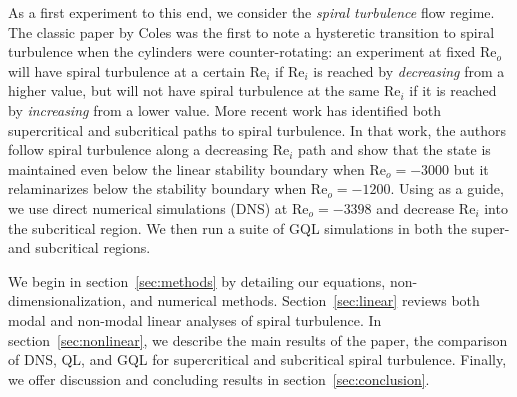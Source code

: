 \documentclass[openacc]{rstransa}%
\newcommand{\Reyn}{\mathrm{Re}}
\begin{document}
As a first experiment to this end, we consider the \emph{spiral turbulence} flow regime. The classic paper by Coles \cite{1965JFM....21..385C} was the first to note a hysteretic transition to spiral turbulence when the cylinders were counter-rotating: an experiment at fixed $\Reyn_o$ will have spiral turbulence at a certain $\Reyn_i$ if $\Reyn_i$ is reached by \emph{decreasing} from a higher value, but will not have spiral turbulence at the same $\Reyn_i$ if it is reached by \emph{increasing} from a lower value. More recent work has identified both supercritical and subcritical paths to spiral turbulence\cite{2009PhRvE..80d6315M}. In that work, the authors follow spiral turbulence along a decreasing $\Reyn_i$ path and show that the state is maintained even below the linear stability boundary when $\Reyn_o = -3000$ but it relaminarizes below the stability boundary when $\Reyn_o = -1200$.
Using \cite{2009PhRvE..80d6315M} as a guide, we use direct numerical simulations (DNS) at $\Reyn_o = -3398$ and decrease $\Reyn_i$ into the subcritical region. We then run a suite of GQL simulations in both the super- and subcritical regions.

We begin in section~\ref{sec:methods} by detailing our equations, non-dimensionalization, and numerical methods. Section~\ref{sec:linear} reviews both modal and non-modal linear analyses of spiral turbulence. In section~\ref{sec:nonlinear}, we describe the main results of the paper, the comparison of DNS, QL, and GQL for supercritical and subcritical spiral turbulence. Finally, we offer discussion and concluding results in section~\ref{sec:conclusion}.
\end{document}
